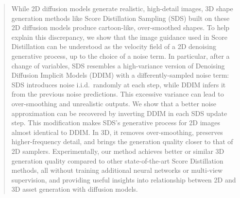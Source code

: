 
\begin{abstract}
  While 2D diffusion models generate realistic, high-detail images, 3D shape generation methods like Score Distillation Sampling (SDS)  built on these 2D diffusion models  produce cartoon-like, over-smoothed shapes. To help explain this discrepancy, we show that the image guidance used in Score Distillation can be understood as the velocity field of a 2D denoising generative process, up to the choice of a noise term. In particular, after a change of variables, SDS resembles a high-variance version of Denoising Diffusion Implicit Models (DDIM) with a differently-sampled noise term: SDS introduces noise i.i.d.\ randomly at each step, while DDIM infers it from the previous noise predictions. This excessive variance can lead to over-smoothing and unrealistic outputs. We show that a better noise approximation can be recovered by inverting DDIM in each SDS update step. This modification makes SDS's generative process for 2D images almost identical to DDIM. In 3D, it removes over-smoothing, preserves higher-frequency detail, and brings the generation quality closer to that of 2D samplers. Experimentally, our method achieves better or similar 3D generation quality compared to other state-of-the-art Score Distillation methods, all without training additional neural networks or multi-view supervision, and providing useful insights into relationship between 2D and 3D asset generation with diffusion models.
\end{abstract}